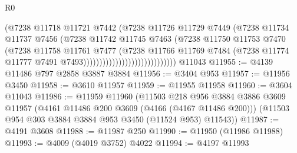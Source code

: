 \begin{lexlean}{R0}
\begin{coremodule}
                                              (@7238
                                                @11718
                                                @11721
                                                @7442
                                                (@7238
                                                  @11726
                                                  @11729
                                                  @7449
                                                  (@7238
                                                    @11734
                                                    @11737
                                                    @7456
                                                    (@7238
                                                      @11742
                                                      @11745
                                                      @7463
                                                      (@7238
                                                        @11750
                                                        @11753
                                                        @7470
                                                        (@7238
                                                          @11758
                                                          @11761
                                                          @7477
                                                          (@7238
                                                            @11766
                                                            @11769
                                                            @7484
                                                            (@7238
                                                              @11774
                                                              @11777
                                                              @7491
                                                              @7493)))))))))))))))))))))))))))))
    @11043
@11955 := @4139 @11486 @797 @2858 @3887 @3884
@11956 := @3404 @953
@11957 := @11956 @3450
@11958 := @3610 @11957
@11959 := @11955 @11958
@11960 := @3604 @11043
@11986 := @11959
    @11960
    (@11503
      @218
      @956
      @3884
      @3886
      @3609
      @11957
      (@4161 @11486 @200 @3609 (@4166 (@4167 @11486 @200)))
      (@11503 @954 @303 @3884 @3884 @953 @3450 (@11524 @953) @11543))
@11987 := @4191 @3608
@11988 := @11987 @250
@11990 := @11950 (@11986 @11988)
@11993 := @4009 (@4019 @3752) @4022
@11994 := @4197 @11993

\end{coremodule}
\end{lexlean}
